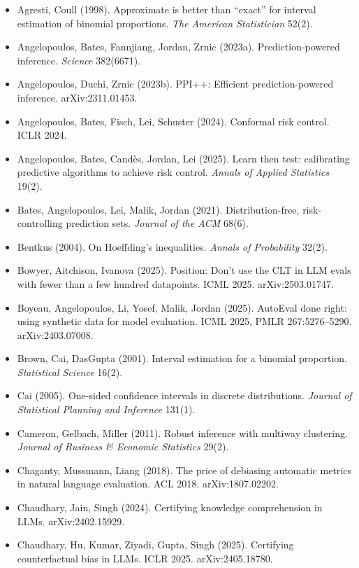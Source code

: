 \documentclass[11pt]{article}
\begin{document}
\begin{itemize}
\item Agresti, Coull (1998). Approximate is better than ``exact'' for interval estimation of binomial proportions. \emph{The American Statistician} 52(2).
\item Angelopoulos, Bates, Fannjiang, Jordan, Zrnic (2023a). Prediction-powered inference. \emph{Science} 382(6671).
\item Angelopoulos, Duchi, Zrnic (2023b). PPI++: Efficient prediction-powered inference. arXiv:2311.01453.
\item Angelopoulos, Bates, Fisch, Lei, Schuster (2024). Conformal risk control. ICLR 2024.
\item Angelopoulos, Bates, Candès, Jordan, Lei (2025). Learn then test: calibrating predictive algorithms to achieve risk control. \emph{Annals of Applied Statistics} 19(2).
\item Bates, Angelopoulos, Lei, Malik, Jordan (2021). Distribution-free, risk-controlling prediction sets. \emph{Journal of the ACM} 68(6).
\item Bentkus (2004). On Hoeffding's inequalities. \emph{Annals of Probability} 32(2).
\item Bowyer, Aitchison, Ivanova (2025). Position: Don't use the CLT in LLM evals with fewer than a few hundred datapoints. ICML 2025. arXiv:2503.01747.
\item Boyeau, Angelopoulos, Li, Yosef, Malik, Jordan (2025). AutoEval done right: using synthetic data for model evaluation. ICML 2025, PMLR 267:5276--5290. arXiv:2403.07008.
\item Brown, Cai, DasGupta (2001). Interval estimation for a binomial proportion. \emph{Statistical Science} 16(2).
\item Cai (2005). One-sided confidence intervals in discrete distributions. \emph{Journal of Statistical Planning and Inference} 131(1).
\item Cameron, Gelbach, Miller (2011). Robust inference with multiway clustering. \emph{Journal of Business \& Economic Statistics} 29(2).
\item Chaganty, Mussmann, Liang (2018). The price of debiasing automatic metrics in natural language evaluation. ACL 2018. arXiv:1807.02202.
\item Chaudhary, Jain, Singh (2024). Certifying knowledge comprehension in LLMs. arXiv:2402.15929.
\item Chaudhary, Hu, Kumar, Ziyadi, Gupta, Singh (2025). Certifying counterfactual bias in LLMs. ICLR 2025. arXiv:2405.18780.

\end{itemize}
\end{document}
